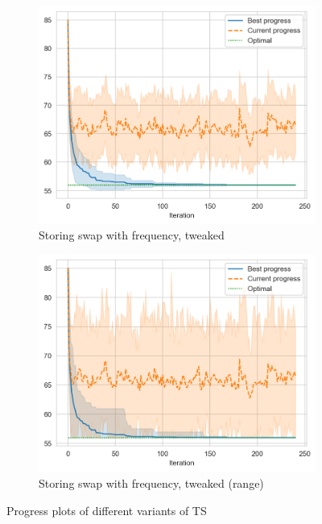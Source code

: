 \begin{figure}[ht]
    \hfill
    \begin{subfigure}{0.48\textwidth}
        \centering
        \includegraphics[width=\textwidth]{../images/p4/store-freq-tweaked.png}
        \caption{Storing swap with frequency, tweaked}
    \end{subfigure}
    \hfill
    \begin{subfigure}{0.48\textwidth}
        \centering
        \includegraphics[width=\textwidth]{../images/p4/store-freq-tweaked-pi.png}
        \caption{Storing swap with frequency, tweaked (range)}
    \end{subfigure}
    \hfill

    \caption{Progress plots of different variants of TS}
    \label{fig:3x2-figure}
\end{figure}

